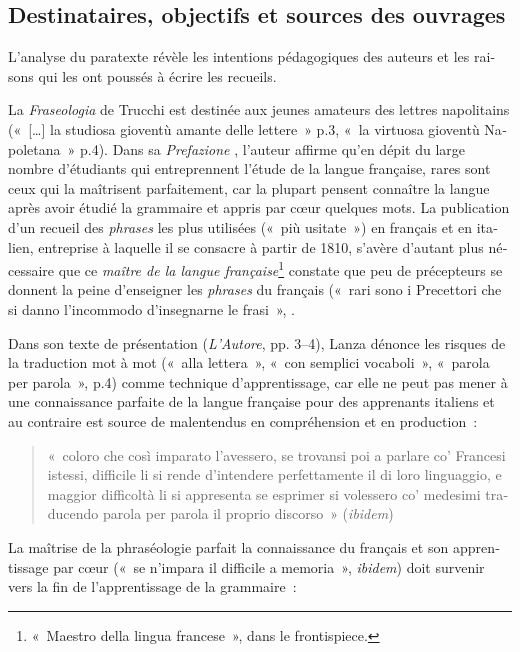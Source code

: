 \documentclass[output=paper,booklanguage=french]{langscibook}
\begin{document}
\begin{otherlanguage}{french}
\subsection{Destinataires, objectifs et sources des ouvrages}

L’analyse du paratexte révèle les intentions pédagogiques des auteurs et les raisons qui les ont poussés à écrire les recueils.

La \emph{Fraseologia} de Trucchi est destinée aux jeunes amateurs des lettres napolitains («~[…] la studiosa gioventù amante delle lettere~» p.3, «~la virtuosa gioventù Napoletana~» p.4). Dans sa \emph{Prefazione} \citep[3--4]{Trucchi1825}, l’auteur affirme qu’en dépit du large nombre d’étudiants qui entreprennent l’étude de la langue française, rares sont ceux qui la maîtrisent parfaitement, car la plupart pensent connaître la langue après avoir étudié la grammaire et appris par cœur quelques mots. La publication d’un recueil des \emph{phrases} les plus utilisées («~più usitate~») en français et en italien, entreprise à laquelle il se consacre à partir de 1810, s’avère d’autant plus nécessaire que ce \emph{maître de la langue française}\footnote{«~Maestro della lingua francese~», dans le frontispiece.} constate que peu de précepteurs se donnent la peine d’enseigner les \emph{phrases} du français («~rari sono i Precettori che si danno l’incommodo d’insegnarne le frasi~», \citep[4]{Trucchi1825}.

Dans son texte de présentation (\emph{L’Autore}, pp. 3--4), Lanza dénonce les risques de la traduction mot à mot («~alla lettera~», «~con semplici vocaboli~», «~parola per parola~», p.4) comme technique d’apprentissage, car elle ne peut pas mener à une connaissance parfaite de la langue française pour des apprenants italiens et au contraire est source de malentendus en compréhension et en production~: 

\begin{quote}
    «~coloro che così imparato l’avessero, se trovansi poi a parlare co’ Francesi istessi, difficile li si rende d’intendere perfettamente il di loro linguaggio, e maggior difficoltà li si appresenta se esprimer si volessero co’ medesimi traducendo parola per parola il proprio discorso~» (\emph{ibidem}) 
\end{quote}

La maîtrise de la phraséologie parfait la connaissance du français et son apprentissage par cœur («~se n’impara il difficile a memoria~», \emph{ibidem}) doit survenir vers la fin de l’apprentissage de la grammaire~: 


\end{otherlanguage}
\end{document}
